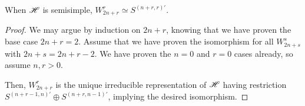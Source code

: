 \documentclass{amsart}
\begin{document}
\begin{corollary}
  When $\mathscr{H}$ is semisimple, $W_{2n + r}^r \simeq S^{(n + r,r)'}$.
\end{corollary}
\begin{proof}
  We may argue by induction on $2n + r$, knowing that we have proven the base case $2n + r = 2$.
  Assume that we have proven the isomorphism for all $W_{2n + s}^{s}$ with $2n + s = 2n + r - 2$.
  We have proven the $n = 0$ and $r = 0$ cases already, so assume $n,r > 0$.
  
  Then, $W_{2n + r}^{r}$ is the unique irreducible representation of $\mathscr{H}$ having restriction $S^{(n+r-1,n)'} \oplus S^{(n + r,n-1)'}$, implying the desired isomorphism.
\end{proof}
\end{document}
